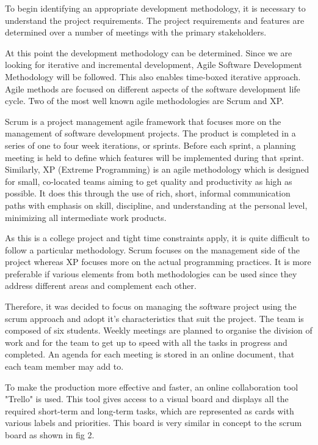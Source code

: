 To begin identifying an appropriate development methodology, it is necessary to understand the project requirements. The project requirements and features are determined over a number of meetings with the primary stakeholders. 

At this point the development methodology can be determined. Since we are looking for iterative and incremental development, Agile Software Development Methodology will be followed. This also enables time-boxed iterative approach. Agile methods are focused on different aspects of the software development life cycle. Two of the most well known agile methodologies are Scrum and XP.

Scrum is a project management agile framework that focuses more on the management of software development projects. The product is completed in a series of one to four week iterations, or sprints. Before each sprint, a planning meeting is held to define which features will be implemented during that sprint. Similarly, XP (Extreme Programming) is an agile methodology which is designed for small, co-located teams aiming to get quality and productivity as high as possible. It does this through the use of rich, short, informal communication paths with emphasis on skill, discipline, and understanding at the personal level, minimizing all intermediate work products.

As this is a college project and tight time constraints apply, it is quite
difficult to follow a particular methodology. Scrum focuses on the management
side of the project whereas XP focuses more on the actual programming
practices. It is more preferable if various elements from both methodologies
can be used since they address different areas and complement each other.

Therefore, it was decided to focus on managing the software project using the scrum
approach and adopt it's characteristics that suit the project. The team is
composed of six students. Weekly meetings are planned to organise the division
of work and for the team to get up to speed with all the tasks in progress and
completed. An agenda for each meeting is stored in an online document, that
each team member may add to. 

To make the production more effective and faster, an online collaboration tool
"Trello" is used. This tool gives access to a visual board and displays all the
required short-term and long-term tasks, which are represented as cards with
various labels and priorities. This board is very similar in concept to the
scrum board as shown in fig 2.

